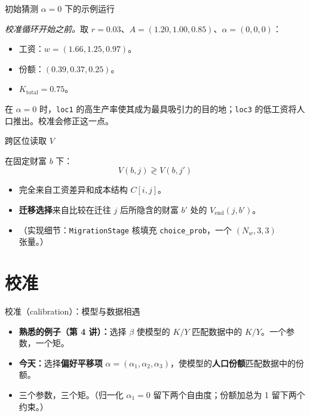 \documentclass[10pt,aspectratio=169]{beamer}
\begin{document}
\begin{frame}{初始猜测 $\alpha = 0$ 下的示例运行}

\emph{校准循环开始之前。}取 $r = 0.03$、$A = (1.20, 1.00, 0.85)$、$\alpha = (0, 0, 0)$：

\begin{itemize}
  \item 工资：$w = (1.66, 1.25, 0.97)$。
  \item 份额：$(0.39, 0.37, 0.25)$。
  \item $K_{\text{total}} = 0.75$。
\end{itemize}

\vspace{0.4em}

在 $\alpha = 0$ 时，\texttt{loc1} 的高生产率使其成为最具吸引力的目的地；\texttt{loc3} 的低工资将人口推出。校准会修正这一点。

\end{frame}

\begin{frame}{跨区位读取 $V$}

在固定财富 $b$ 下：
\[
V(b, j) \gtrless V(b, j')
\]

\begin{itemize}
  \item 完全来自工资差异和成本结构 $C[i, j]$。
  \item \textbf{迁移选择}来自比较在迁往 $j$ 后所隐含的财富 $b'$ 处的 $V_{\text{end}}(j, b')$。
  \item （实现细节：\texttt{MigrationStage} 核填充 \texttt{choice\_prob}，一个 $(N_w, 3, 3)$ 张量。）
\end{itemize}

\end{frame}

\section[校准]{校准}

\begin{frame}{校准（calibration）：模型与数据相遇}

\begin{itemize}
  \item \textbf{熟悉的例子（第 4 讲）：}选择 $\beta$ 使模型的 $K/Y$ 匹配数据中的 $K/Y$。一个参数，一个矩。
  \item \textbf{今天：}选择\textbf{偏好平移项} $\alpha = (\alpha_1, \alpha_2, \alpha_3)$，使模型的\textbf{人口份额}匹配数据中的份额。
  \item 三个参数，三个矩。（归一化 $\alpha_1 = 0$ 留下两个自由度；份额加总为 1 留下两个约束。）
\end{itemize}

\end{frame}
\end{document}
